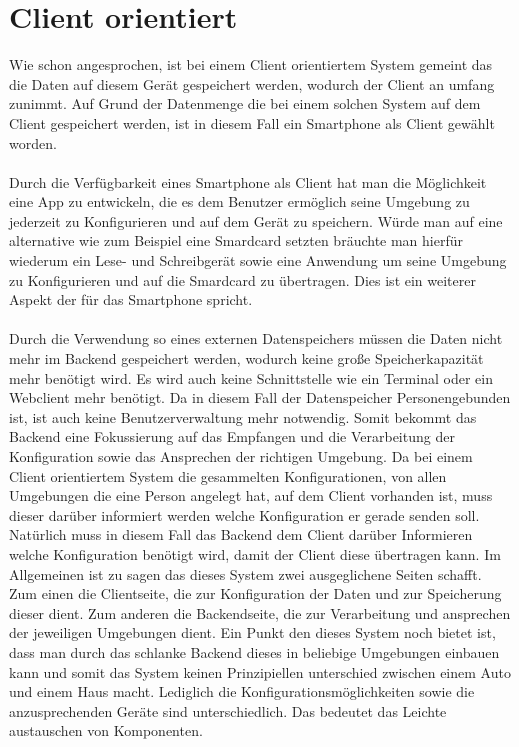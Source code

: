 \section{Client orientiert}

Wie schon angesprochen, ist bei einem Client orientiertem System gemeint das die Daten auf diesem Gerät gespeichert werden, wodurch der Client an umfang zunimmt. Auf Grund der Datenmenge die bei einem solchen System auf dem Client gespeichert werden, ist in diesem Fall ein Smartphone als Client gewählt worden.  
\\\\
Durch die Verfügbarkeit eines Smartphone als Client hat man die Möglichkeit eine App zu entwickeln, die es dem Benutzer ermöglich seine Umgebung zu jederzeit zu Konfigurieren und auf dem Gerät zu speichern. Würde man auf eine alternative wie zum Beispiel eine Smardcard setzten bräuchte man hierfür wiederum ein Lese- und Schreibgerät sowie eine Anwendung um seine Umgebung zu Konfigurieren und auf die Smardcard zu übertragen. Dies ist ein weiterer Aspekt der für das Smartphone spricht.
\\\\
Durch die Verwendung so eines externen Datenspeichers müssen die Daten nicht mehr im Backend gespeichert werden, wodurch keine große Speicherkapazität mehr benötigt wird. Es wird auch keine Schnittstelle wie ein Terminal oder ein Webclient mehr benötigt. Da in diesem Fall der Datenspeicher Personengebunden ist, ist auch keine Benutzerverwaltung mehr notwendig. Somit bekommt das Backend eine Fokussierung auf das Empfangen und die Verarbeitung der Konfiguration sowie das Ansprechen der richtigen Umgebung.
Da bei einem Client orientiertem System die gesammelten Konfigurationen, von allen Umgebungen die eine Person angelegt hat, auf dem Client vorhanden ist, muss dieser darüber informiert werden welche Konfiguration er gerade senden soll. 
Natürlich muss in diesem Fall das Backend dem Client darüber Informieren welche Konfiguration benötigt wird, damit der Client diese übertragen kann. Im Allgemeinen ist zu sagen das dieses System zwei ausgeglichene Seiten schafft. Zum einen die Clientseite, die zur Konfiguration der Daten und zur Speicherung dieser dient. Zum anderen die Backendseite, die zur Verarbeitung und ansprechen der jeweiligen Umgebungen dient. Ein Punkt den dieses System noch bietet ist, dass man durch das schlanke Backend dieses in beliebige Umgebungen einbauen kann und somit das System keinen Prinzipiellen unterschied zwischen einem Auto und einem Haus macht. Lediglich die Konfigurationsmöglichkeiten sowie die anzusprechenden Geräte sind unterschiedlich. Das bedeutet das Leichte austauschen von Komponenten.

